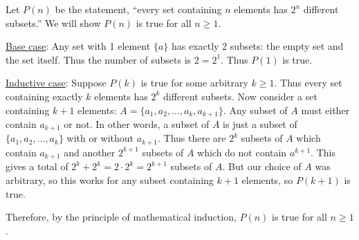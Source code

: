 \begin{questions}
	\begin{answer}
		Let $P(n)$ be the statement, ``every set containing $n$ elements has $2^n$ different subsets.''  We will show $P(n)$ is true for all $n \ge 1$.

		\underline{Base case}: Any set with 1 element $\{a\}$ has exactly 2 subsets: the empty set and the set itself.  Thus the number of subsets is $2= 2^1$.  Thus $P(1)$ is true.

		\underline{Inductive case}: Suppose $P(k)$ is true for some arbitrary $k \ge 1$.  Thus every set containing exactly $k$ elements has $2^k$ different subsets.  Now consider a set containing $k+1$ elements: $A = \{a_1, a_2, \ldots, a_k, a_{k+1}\}$.  Any subset of $A$ must either contain $a_{k+1}$ or not.  In other words, a subset of $A$ is just a subset of $\{a_1, a_2,\ldots, a_k\}$ with or without $a_{k+1}$.  Thus there are $2^k$ subsets of $A$ which contain $a_{k+1}$ and another $2^{k+1}$ subsets of $A$ which do not contain $a^{k+1}$.  This gives a total of $2^k + 2^k = 2\cdot 2^k = 2^{k+1}$ subsets of $A$.  But our choice of $A$ was arbitrary, so this works for any subset containing $k+1$ elements, so $P(k+1)$ is true.

		Therefore, by the principle of mathematical induction, $P(n)$ is true for all $n \ge 1$.
	\end{answer}


\end{questions}



